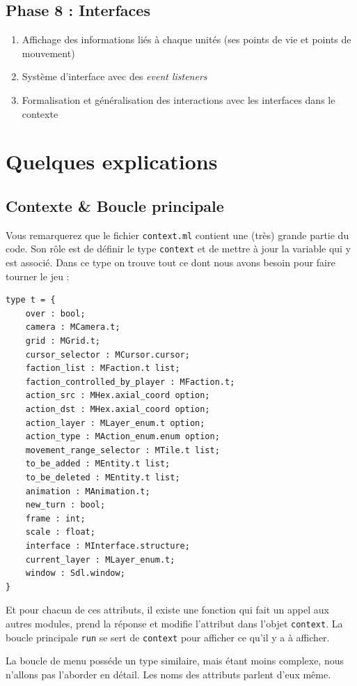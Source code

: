 \documentclass{article}
\begin{document}
\subsection*{Phase 8 : Interfaces}
\begin{enumerate}
    \item Affichage des informations liés à chaque unités (ses points de vie et points de mouvement)
    \item Système d'interface avec des \textit{event listeners}
    \item Formalisation et généralisation des interactions avec les interfaces dans le contexte
\end{enumerate}

\section{Quelques explications}
\subsection{Contexte \& Boucle principale}
Vous remarquerez que le fichier \texttt{context.ml} contient une (très) grande partie du code. Son rôle
est de définir le type \texttt{context} et de mettre à jour la variable qui y est associé.
Dans ce type on trouve tout ce dont nous avons besoin pour faire tourner le jeu : 

\begin{verbatim}
type t = {
    over : bool; 
    camera : MCamera.t;
    grid : MGrid.t;
    cursor_selector : MCursor.cursor;
    faction_list : MFaction.t list;
    faction_controlled_by_player : MFaction.t;
    action_src : MHex.axial_coord option;
    action_dst : MHex.axial_coord option;
    action_layer : MLayer_enum.t option;
    action_type : MAction_enum.enum option;
    movement_range_selector : MTile.t list;
    to_be_added : MEntity.t list;
    to_be_deleted : MEntity.t list;
    animation : MAnimation.t;
    new_turn : bool;
    frame : int;
    scale : float;
    interface : MInterface.structure;
    current_layer : MLayer_enum.t;
    window : Sdl.window;
}
\end{verbatim}

Et pour chacun de ces attributs, il existe une fonction qui fait un appel aux autres modules, prend la réponse
et modifie l'attribut dans l'objet \texttt{context}. La boucle principale \texttt{run} se sert de \texttt{context}
pour afficher ce qu'il y a à afficher.

La boucle de menu posséde un type similaire, mais étant moins complexe, nous n'allons pas l'aborder en détail. Les noms des attributs parlent d'eux même.
\end{document}
